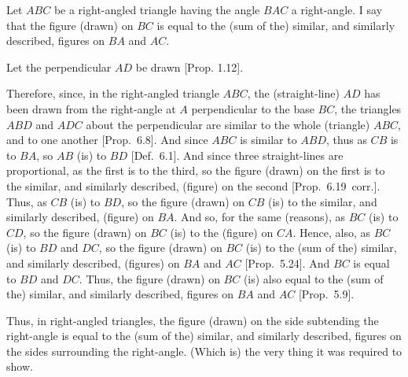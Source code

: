 \begin{Parallel}{}{}
{\epsfysize=2in
\centerline{}

Let $ABC$ be a right-angled triangle having the angle $BAC$ a right-angle. I say
that the figure (drawn) on $BC$ is equal to the (sum of the) similar,
and similarly described, figures on $BA$ and $AC$.

Let the perpendicular $AD$ be drawn  [Prop. 1.12].

Therefore, since, in the right-angled triangle  $ABC$, the (straight-line) $AD$ has been drawn from the right-angle
at $A$ perpendicular to the base $BC$, the triangles $ABD$
and $ADC$ about the perpendicular are similar to the whole (triangle) $ABC$,
and to one another  [Prop.~6.8].
And since $ABC$ is similar to $ABD$, thus as $CB$ is to $BA$, so $AB$ (is) to
$BD$ [Def.~6.1]. And since three straight-lines
are proportional, as the first is to the third, so the figure (drawn) on the
first is to the similar, and similarly described, (figure) on the second 
[Prop.~6.19~corr.]. Thus, as $CB$ (is) to
$BD$, so the figure (drawn) on $CB$ (is) to the similar, and similarly
described, (figure) on $BA$. And so, for the same (reasons), as $BC$ (is) to
$CD$, so the figure  (drawn) on $BC$ (is) to the (figure) on $CA$. Hence,
also, as $BC$ (is) to $BD$ and $DC$, so the figure (drawn) on $BC$ (is) to
the (sum of the) similar, and similarly described, (figures) on $BA$ and $AC$ [Prop.~5.24].
And $BC$ is equal to $BD$ and $DC$. Thus, the figure (drawn) on $BC$
(is) also equal to the (sum of the) similar, and similarly described, figures
on $BA$ and $AC$ [Prop.~5.9].

Thus, in right-angled triangles, the figure (drawn)
on the side subtending the right-angle is equal to the (sum of the) similar, and similarly
described, figures on the sides surrounding the right-angle. (Which is)
the very thing it was required to show.\\~\\}
\end{Parallel}

